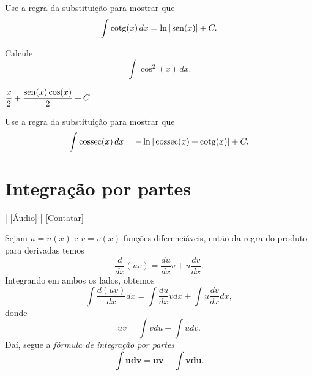 \begin{exer}\label{exer:int_subs_cotg}
  Use a regra da substituição para mostrar que
  \begin{equation}
    \int \operatorname{cotg}(x)\,dx = \ln|\operatorname{sen}(x)| + C.
  \end{equation}
\end{exer}

\begin{exer}
  Calcule
  \begin{equation}
    \int \cos^2(x)\,dx.
  \end{equation}
\end{exer}
\begin{resp}
  $\displaystyle \frac{x}{2} + \frac{\operatorname{sen}(x)\cos(x)}{2} + C$
\end{resp}

\begin{exer}\label{exer:int_subs_cossec}
  Use a regra da substituição para mostrar que
  \begin{equation}
    \int \operatorname{cossec}(x)\,dx = -\ln|\operatorname{cossec}(x)+\operatorname{cotg}(x)| + C.
  \end{equation}
\end{exer}


\section{Integração por partes}\label{cap_int_sec_partes}

\begin{flushright}
  [Vídeo] | [Áudio] | \href{https://phkonzen.github.io/notas/contato.html}{[Contatar]}
\end{flushright}

Sejam $u=u(x)$ e $v=v(x)$ funções diferenciáveis, então da regra do produto para derivadas temos
\begin{equation}
  \frac{d}{dx}(uv) = \frac{du}{dx}v + u\frac{dv}{dx}.
\end{equation}
Integrando em ambos os lados, obtemos
\begin{equation}
  \int \frac{d (uv)}{dx}dx = \int \frac{du}{dx}vdx + \int u\frac{dv}{dx}dx,
\end{equation}
donde
\begin{equation}
  uv = \int vdu + \int udv.
\end{equation}
Daí, segue a \emph{fórmula de integração por partes}
\begin{equation}
  \pmb{\int udv = uv - \int vdu}.
\end{equation}

